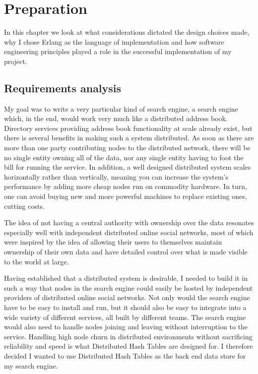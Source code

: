 

\chapter{Preparation}
In this chapter we look at what considerations dictated the design choices made, why I chose Erlang as the language of implementation and how software engineering principles played a role in the successful implementation of my project.

\section{Requirements analysis}
My goal was to write a very particular kind of search engine, a search engine which, in the end, would work very much like a distributed address book.
Directory services providing address book functionality at scale already exist, but there is several benefits in making such a system distributed. As soon as there are more than one party contributing nodes to the distributed network, there will be no single entity owning all of the data, nor any single entity having to foot the bill for running the service. In addition, a well designed distributed system scales horizontally rather than vertically, meaning you can increase the system's performance by adding more cheap nodes run on commodity hardware. In turn, one can avoid buying new and more powerful machines to replace existing ones, cutting costs.

The idea of not having a central authority with ownership over the data resonates especially well with independent distributed online social networks, most of which were inspired by the idea of allowing their users to themselves maintain ownership of their own data and have detailed control over what is made visible to the world at large.

Having established that a distributed system is desirable, I needed to build it in such a way that nodes in the search engine could easily be hosted by independent providers of distributed online social networks. Not only would the search engine have to be easy to install and run, but it should also be easy to integrate into a wide variety of different services, all built by different teams. The search engine would also need to handle nodes joining and leaving without interruption to the service.
Handling high node churn in distributed environments without sacrificing reliability and speed is what Distributed Hash Tables are designed for. I therefore decided I wanted to use Distributed Hash Tables as the back end data store for my search engine.

